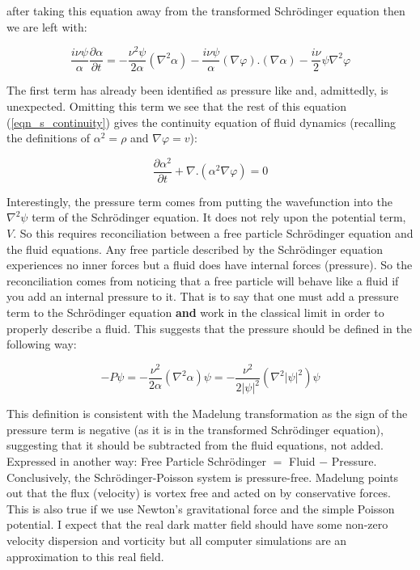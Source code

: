 \noindent after taking this equation away from the transformed Schr\"odinger equation then we are left with:

\begin{equation}
\label{eqn_s_continuity}
\frac{i\nu\psi}{\alpha}\frac{\partial\alpha}{\partial t} = -\frac{\nu^2\psi}{2\alpha}(\nabla^2\alpha) -\frac{i\nu\psi}{\alpha}(\nabla\varphi).(\nabla\alpha) -\frac{i\nu}{2}\psi\nabla^2\varphi
\end{equation}

\noindent The first term has already been identified as pressure like and, admittedly, is unexpected. Omitting this term we see that the rest of this equation (\ref{eqn_s_continuity}) gives the continuity equation of fluid dynamics (recalling the definitions of $\alpha^2 = \rho$ and $\nabla \varphi = v$):

\begin{equation}
\frac{\partial\alpha^2}{\partial t} + \nabla . (\alpha^2\nabla\varphi)= 0
\end{equation}

\noindent Interestingly, the pressure term comes from putting the wavefunction into the $\nabla^2 \psi$ term of the Schr\"odinger equation. It does not rely upon the potential term, $V$. So this requires reconciliation between a free particle Schr\"odinger equation and the fluid equations. Any free particle described by the Schr\"odinger equation experiences no inner forces but a fluid does have internal forces (pressure). So the reconciliation comes from noticing that a free particle will behave like a fluid if you add an internal pressure to it. That is to say that one must add a pressure term to the Schr\"odinger equation {\bf and} work in the classical limit in order to properly describe a fluid. This suggests that the pressure should be defined in the following way:

\begin{equation}
\label{eqn_pressure}
-P\psi = -\frac{\nu^2}{2\alpha}(\nabla^2\alpha)\psi = -\frac{\nu^2}{2|\psi|^2}(\nabla^2|\psi|^2)\psi
\end{equation}

\noindent This definition is consistent with the Madelung transformation as the sign of the pressure term is negative (as it is in the transformed Schr\"odinger equation), suggesting that it should be subtracted from the fluid equations, not added. Expressed in another way: Free Particle Schr\"odinger $=$ Fluid $-$ Pressure. Conclusively, the Schr\"odinger-Poisson system is pressure-free. Madelung points out that the flux (velocity) is vortex free and acted on by conservative forces. This is also true if we use Newton's gravitational force and the simple Poisson potential. I expect that the real dark matter field should have some non-zero velocity dispersion and vorticity but all computer simulations are an approximation to this real field.

